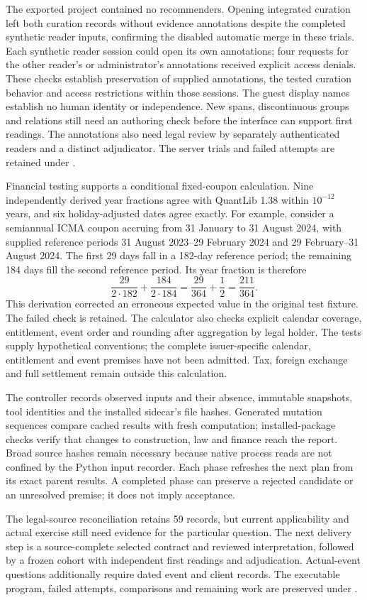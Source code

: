 The exported project contained no recommenders. Opening integrated curation
left both curation records without evidence annotations despite the completed
synthetic reader inputs, confirming the disabled automatic merge in these
trials. Each synthetic reader session could open its own annotations; four
requests for the other reader's or administrator's annotations received explicit
access denials. These checks establish preservation of supplied annotations,
the tested curation behavior and access restrictions within those sessions.
The guest display names establish no human identity or independence. New spans,
discontinuous groups and relations still need an authoring check before the
interface can support first readings. The annotations also need legal review
by separately authenticated readers and a distinct adjudicator. The
server trials and failed attempts are retained under
.

\begingroup
{}
Financial testing supports a conditional fixed-coupon calculation. Nine
independently derived year fractions agree with QuantLib 1.38 within
$10^{-12}$ years, and six holiday-adjusted dates agree exactly. For example,
consider a semiannual ICMA coupon accruing from 31 January to 31 August 2024,
with supplied reference periods 31 August 2023--29 February 2024 and
29 February--31 August 2024. The first 29 days fall in a 182-day reference
period; the remaining 184 days fill the second reference period. Its year
fraction is therefore
\[
 \frac{29}{2\cdot182}+\frac{184}{2\cdot184}
 =\frac{29}{364}+\frac12=\frac{211}{364}.
\]
This derivation corrected an erroneous expected value in the original test
fixture. The failed check is retained. The calculator also checks explicit
calendar coverage, entitlement, event order and rounding after aggregation by
legal holder. The tests supply hypothetical conventions; the complete
issuer-specific calendar, entitlement and event premises have not been admitted.
Tax, foreign exchange and full settlement remain outside this calculation.
\par\endgroup

The controller records observed inputs and their absence, immutable snapshots,
tool identities and the installed sidecar's file hashes. Generated mutation
sequences compare cached results with fresh computation; installed-package
checks verify that changes to construction, law and finance reach the report.
Broad source hashes remain necessary because native process reads are not
confined by the Python input recorder. Each phase refreshes the next plan from
its exact parent results. A completed phase can preserve a rejected candidate
or an unresolved premise; it does not imply acceptance.

The legal-source reconciliation retains 59 records, but current applicability
and actual exercise still need evidence for the particular question. The next
delivery step is a source-complete selected contract and reviewed interpretation,
followed by a frozen cohort with independent first readings and adjudication.
Actual-event questions additionally require dated event and client records.
The executable program, failed attempts, comparisons and remaining work are
preserved under .
